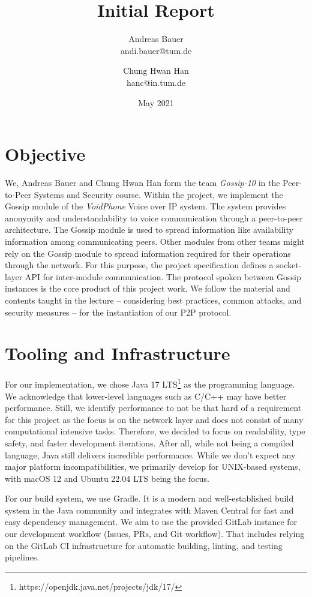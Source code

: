 \documentclass[a4paper, 11pt]{article}
\title{Initial Report}
\author{
    Andreas Bauer\\
    andi.bauer@tum.de
  \and
    Chung Hwan Han\\
    hanc@in.tum.de
}
\date{May 2021}
\begin{document}
    \maketitle

    \section{Objective}\label{sec:objective}

    We, Andreas Bauer and Chung Hwan Han form the team \textit{Gossip-10} in the Peer-to-Peer Systems and Security course.
    Within the project, we implement the Gossip module of the \textit{VoidPhone} Voice over IP system.
    The system provides anonymity and understandability to voice communication through a peer-to-peer architecture.
    The Gossip module is used to spread information like availability information among communicating peers.
    Other modules from other teams might rely on the Gossip module to spread information required for their operations
    through the network.
    For this purpose, the project specification defines a socket-layer API for inter-module communication.
    The protocol spoken between Gossip instances is the core product of this project work.
    We follow the material and contents taught in the lecture -- considering best practices, common attacks, and security measures --
    for the instantiation of our P2P protocol.

    \section{Tooling and Infrastructure}\label{sec:tooling-and-infrastructure}
    For our implementation, we chose Java 17 LTS\footnote{https://openjdk.java.net/projects/jdk/17/} as the programming language.
    We acknowledge that lower-level languages such as C/C++ may have better performance.
    Still, we identify performance to not be that hard of a requirement for this project
    as the focus is on the network layer and does not consist of many computational intensive tasks.
    Therefore, we decided to focus on readability, type safety, and faster development iterations.
    After all, while not being a compiled language, Java still delivers incredible performance.
    While we don't expect any major platform incompatibilities, we primarily develop for UNIX-based systems, with macOS 12 and Ubuntu 22.04 LTS being the focus.

    For our build system, we use Gradle.
    It is a modern and well-established build system in the Java community and integrates with Maven Central for fast and easy dependency management.
    We aim to use the provided GitLab instance for our development workflow (Issues, PRs, and Git workflow).
    That includes relying on the GitLab CI infrastructure for automatic building, linting, and testing pipelines.
\end{document}
